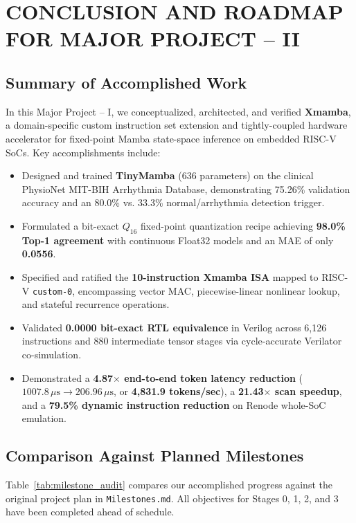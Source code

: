 \documentclass[11pt,a4paper,oneside]{report}
\begin{document}
\chapter{CONCLUSION AND ROADMAP FOR MAJOR PROJECT -- II}
\label{Chapter7}
\rhead{}

\section{Summary of Accomplished Work}
In this Major Project -- I, we conceptualized, architected, and verified \textbf{Xmamba}, a domain-specific custom instruction set extension and tightly-coupled hardware accelerator for fixed-point Mamba state-space inference on embedded RISC-V SoCs. Key accomplishments include:
\begin{itemize}
    \item Designed and trained \textbf{TinyMamba} (636 parameters) on the clinical PhysioNet MIT-BIH Arrhythmia Database, demonstrating 75.26\% validation accuracy and an 80.0\% vs. 33.3\% normal/arrhythmia detection trigger.
    \item Formulated a bit-exact $Q_{16}$ fixed-point quantization recipe achieving \textbf{98.0\% Top-1 agreement} with continuous Float32 models and an MAE of only \textbf{0.0556}.
    \item Specified and ratified the \textbf{10-instruction Xmamba ISA} mapped to RISC-V \texttt{custom-0}, encompassing vector MAC, piecewise-linear nonlinear lookup, and stateful recurrence operations.
    \item Validated \textbf{0.0000 bit-exact RTL equivalence} in Verilog across 6,126 instructions and 880 intermediate tensor stages via cycle-accurate Verilator co-simulation.
    \item Demonstrated a \textbf{4.87$\times$ end-to-end token latency reduction} ($1007.8\,\mu\text{s} \to 206.96\,\mu\text{s}$, or \textbf{4,831.9 tokens/sec}), a \textbf{21.43$\times$ scan speedup}, and a \textbf{79.5\% dynamic instruction reduction} on Renode whole-SoC emulation.
\end{itemize}

\section{Comparison Against Planned Milestones}
Table~\ref{tab:milestone_audit} compares our accomplished progress against the original project plan in \texttt{Milestones.md}. All objectives for Stages 0, 1, 2, and 3 have been completed ahead of schedule.
\end{document}
